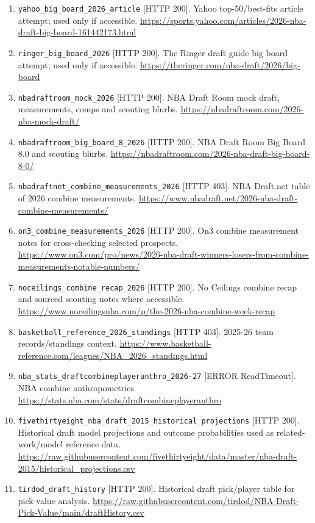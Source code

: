\documentclass[11pt]{article}
\begin{document}
\begin{enumerate}[leftmargin=*, itemsep=2pt]
\item \texttt{yahoo\_big\_board\_2026\_article} [HTTP 200]. Yahoo top-50/best-fits article attempt; used only if accessible. \url{https://sports.yahoo.com/articles/2026-nba-draft-big-board-161442173.html}
\item \texttt{ringer\_big\_board\_2026} [HTTP 200]. The Ringer draft guide big board attempt; used only if accessible. \url{https://theringer.com/nba-draft/2026/big-board}
\item \texttt{nbadraftroom\_mock\_2026} [HTTP 200]. NBA Draft Room mock draft, measurements, comps and scouting blurbs. \url{https://nbadraftroom.com/2026-nba-mock-draft/}
\item \texttt{nbadraftroom\_big\_board\_8\_2026} [HTTP 200]. NBA Draft Room Big Board 8.0 and scouting blurbs. \url{https://nbadraftroom.com/2026-nba-draft-big-board-8-0/}
\item \texttt{nbadraftnet\_combine\_measurements\_2026} [HTTP 403]. NBA Draft.net table of 2026 combine measurements. \url{https://www.nbadraft.net/2026-nba-draft-combine-measurements/}
\item \texttt{on3\_combine\_measurements\_2026} [HTTP 200]. On3 combine measurement notes for cross-checking selected prospects. \url{https://www.on3.com/pro/news/2026-nba-draft-winners-losers-from-combine-measurements-notable-numbers/}
\item \texttt{noceilings\_combine\_recap\_2026} [HTTP 200]. No Ceilings combine recap and sourced scouting notes where accessible. \url{https://www.noceilingsnba.com/p/the-2026-nba-combine-week-recap}
\item \texttt{basketball\_reference\_2026\_standings} [HTTP 403]. 2025-26 team records/standings context. \url{https://www.basketball-reference.com/leagues/NBA_2026_standings.html}
\item \texttt{nba\_stats\_draftcombineplayeranthro\_2026-27} [ERROR ReadTimeout]. NBA combine anthropometrics \url{https://stats.nba.com/stats/draftcombineplayeranthro}
\item \texttt{fivethirtyeight\_nba\_draft\_2015\_historical\_projections} [HTTP 200]. Historical draft model projections and outcome probabilities used as related-work/model reference data. \url{https://raw.githubusercontent.com/fivethirtyeight/data/master/nba-draft-2015/historical_projections.csv}
\item \texttt{tirdod\_draft\_history} [HTTP 200]. Historical draft pick/player table for pick-value analysis. \url{https://raw.githubusercontent.com/tirdod/NBA-Draft-Pick-Value/main/draftHistory.csv}

\end{enumerate}
\end{document}
